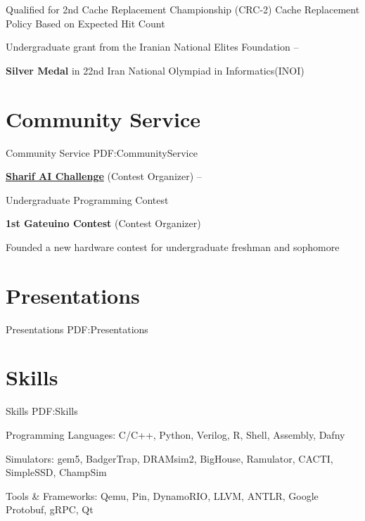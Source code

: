 \documentclass[a4paper,9pt,oneside]{article}
\begin{document}
\begin{body}
\BulletItem
Qualified for 2nd Cache Replacement Championship (CRC-2)
\SubBulletItem
Cache Replacement Policy Based on Expected Hit Count
\hfill
{}

\BulletItem
Undergraduate grant from the Iranian National Elites Foundation
\hfill
{} -- 

\BulletItem
\textbf{Silver Medal} in 22nd Iran National Olympiad in Informatics(INOI)
\hfill
{}




\section
{Community Service}
{Community Service}
{PDF:CommunityService}

\BulletItem
\href{https://github.com/SharifAIChallenge}{
\textbf{Sharif AI Challenge}} (Contest Organizer)
\hfill
{} --

\SubBulletItem
Undergraduate Programming Contest

\BulletItem
\textbf{1st Gateuino Contest} (Contest Organizer)
\hfill
{}

\SubBulletItem
Founded a new hardware contest for undergraduate freshman and sophomore

\section
{Presentations}
{Presentations}
{PDF:Presentations}



\section
{Skills}
{Skills}
{PDF:Skills}

\BulletItem
Programming Languages:
C/C++,
Python,
Verilog,
R,
Shell,
Assembly,
Dafny

\BulletItem
Simulators:
gem5,
BadgerTrap,
DRAMsim2,
BigHouse,
Ramulator,
CACTI,
SimpleSSD,
ChampSim

\BulletItem
Tools \& Frameworks:
Qemu,
Pin,
DynamoRIO,
LLVM,
ANTLR,
Google Protobuf,
gRPC,
Qt


\end{body}
\end{document}
